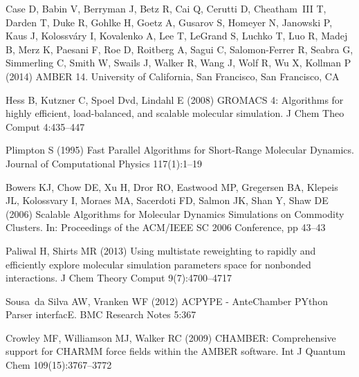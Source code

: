 \begin{thebibliography}{25}
Case D, Babin V, Berryman J, Betz R, Cai Q, Cerutti D, Cheatham~III T, Darden
  T, Duke R, Gohlke H, Goetz A, Gusarov S, Homeyer N, Janowski P, Kaus J,
  Kolossv\'{a}ry I, Kovalenko A, Lee T, LeGrand S, Luchko T, Luo R, Madej B,
  Merz K, Paesani F, Roe D, Roitberg A, Sagui C, Salomon-Ferrer R, Seabra G,
  Simmerling C, Smith W, Swails J, Walker R, Wang J, Wolf R, Wu X, Kollman P
  (2014) {AMBER 14}. University of California, San Francisco, San Francisco, CA

Hess B, Kutzner C, Spoel Dvd, Lindahl E (2008) {GROMACS} 4: {Algorithms} for
  highly efficient, load-balanced, and scalable molecular simulation. J Chem
  Theo Comput 4:435--447

Plimpton S (1995) Fast {Parallel} {Algorithms} for {Short}-{Range} {Molecular}
  {Dynamics}. Journal of Computational Physics 117(1):1--19

Bowers KJ, Chow DE, Xu H, Dror RO, Eastwood MP, Gregersen BA, Klepeis JL,
  Kolossvary I, Moraes MA, Sacerdoti FD, Salmon JK, Shan Y, Shaw DE (2006)
  Scalable {Algorithms} for {Molecular} {Dynamics} {Simulations} on {Commodity}
  {Clusters}. In: Proceedings of the {ACM}/{IEEE} {SC} 2006 {Conference}, pp
  43--43

Paliwal H, Shirts MR (2013) Using multistate reweighting to rapidly and
  efficiently explore molecular simulation parameters space for nonbonded
  interactions. J Chem Theory Comput 9(7):4700--4717

Sousa~da Silva AW, Vranken WF (2012) {ACPYPE} - {AnteChamber} {PYthon} {Parser}
  {interfacE}. BMC Research Notes 5:367

Crowley MF, Williamson MJ, Walker RC (2009) {CHAMBER}: {Comprehensive} support
  for {CHARMM} force fields within the {AMBER} software. Int J Quantum Chem
  109(15):3767--3772


\end{thebibliography}

